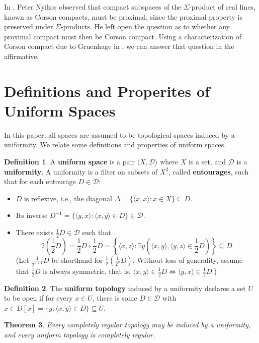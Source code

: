 \documentclass{amsart}
\newtheorem{thm}{Theorem}[section]
\theoremstyle{definition}
\newtheorem{defn}[thm]{Definition}
\theoremstyle{remark}
\newcommand{\mc}{\mathcal}
\newcommand{\<}{\langle}
\renewcommand{\>}{\rangle}
\begin{document}
In \cite{n}, Peter Nyikos observed that compact subspaces of the $\Sigma$-product of real lines, known as Corson compacts, must be proximal, since the proximal property is preserved under $\Sigma$-products. He left open the question as to whether any proximal compact must then be Corson compact. Using a characterization of Corson compact due to Gruenhage in \cite{g}, we can answer that question in the affirmative.

\section{Definitions and Properites of Uniform Spaces}

In this paper, all spaces are assumed to be topological spaces induced by a uniformity. We relate some definitions and properties of uniform spaces.

\begin{defn}
  A \textbf{uniform space} is a pair $\<X,\mc{D}\>$ where $X$ is a set, and $\mc{D}$ is a \textbf{uniformity}. A uniformity is a filter on subsets of $X^2$, called \textbf{entourages}, such that for each entourage $D\in \mc D$:
  \begin{itemize}
      \item $D$ is reflexive, i.e., the diagonal $\Delta=\{\<x,x\>:x\in X\}\subseteq D$.
      \item Its inverse $D^{-1}=\{\<y,x\>:\<x,y\>\in D\}\in \mc D$.
      \item There exists $\frac{1}{2}D\in\mc D$ such that 
        \[
          2\left(\frac{1}{2}D\right)=\frac{1}{2}D\circ \frac{1}{2}D=\left\{\<x,z\>:\exists y\left(\<x,y\>,\<y,z\>\in \frac{1}{2}D\right)\right\}\subseteq D
        \]
      (Let $\frac{1}{2^{n+1}}D$ be shorthand for $\frac{1}{2}(\frac{1}{2^{n}}D)$. Without loss of generality, assume that $\frac{1}{2}D$ is always symmetric, that is, $\<x,y\>\in \frac{1}{2} D\Leftrightarrow \<y,x\>\in\frac{1}{2}D$.)
    \end{itemize}
\end{defn}

\begin{defn}
  The \textbf{uniform topology} induced by a uniformity declares a set $U$ to be open if for every $x\in U$, there is some $D\in\mc D$ with $x\in D[x]=\{y: \<x,y\>\in D\}\subseteq U$.
\end{defn}

\begin{thm}
  Every completely regular topology may be induced by a uniformity, and every uniform topology is completely regular.
\end{thm}
\end{document}
